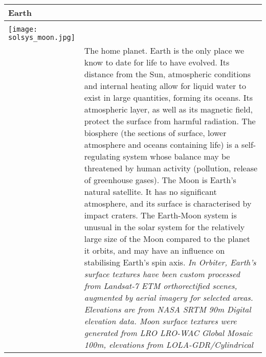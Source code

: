 \documentclass[Orbiter User Manual.tex]{subfiles}
\begin{document}
\begin{table}[H]
	\begin{tabularx}{\textwidth}{ |lX| }
	\hline\rule{0pt}{2ex}
	\textbf{Earth} &\\
	\hline\rule{0pt}{2ex}
	\adjustbox{valign=t}{
		\begin{tabular}{ c }
		\texttt{[image: solsys\_earth.jpg]}\\
		\texttt{[image: solsys\_moon.jpg]}\\
		\end{tabular}
		}
	& \vfill
	The home planet. Earth is the only place we know to date for life to have evolved. Its distance from the Sun, atmospheric conditions and internal heating allow for liquid water to exist in large quantities, forming its oceans. Its atmospheric layer, as well as its magnetic field, protect the surface from harmful radiation. The bio­sphere (the sections of surface, lower atmosphere and oceans containing life) is a self-regulating system whose balance may be threatened by human activity (pollution, release of greenhouse gases).\newline
	The Moon is Earth's natural satellite. It has no significant atmosphere, and its surface is characterised by impact craters. The Earth-Moon system is unusual in the solar system for the relatively large size of the Moon compared to the planet it orbits, and may have an influence on stabilising Earth's spin axis.\newline
	\newline
	\textit{In Orbiter, Earth's surface textures have been custom processed from Landsat-7 ETM orthorectified scenes, augmented by aerial imagery for selected areas. Elevations are from NASA SRTM 90m Digital elevation data. Moon surface textures were generated from LRO LRO-WAC Global Mosaic 100m, elevations from LOLA-GDR/Cylindrical}\\
	\hline
	\end{tabularx}
\end{table}
\end{document}
